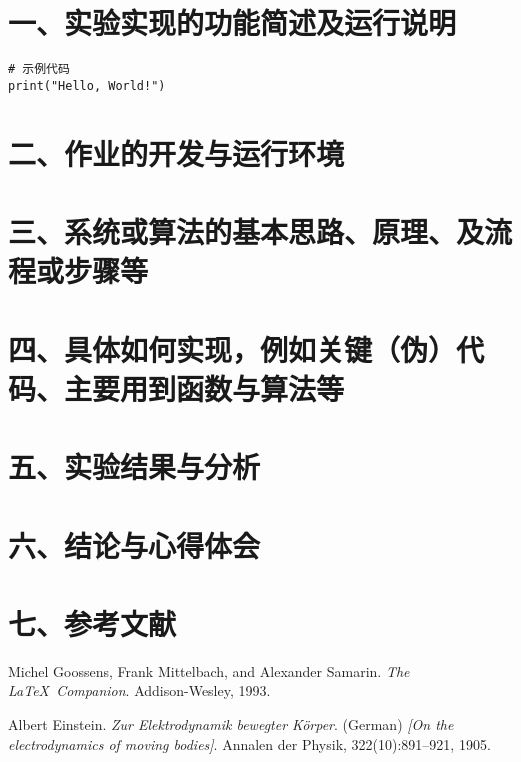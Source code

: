 \documentclass{CVrep}
\begin{document}
\maketitle

\section*{一、实验实现的功能简述及运行说明}
\begin{verbatim}
# 示例代码
print("Hello, World!")
\end{verbatim}


\section*{二、作业的开发与运行环境}

\section*{三、系统或算法的基本思路、原理、及流程或步骤等}

\section*{四、具体如何实现，例如关键（伪）代码、主要用到函数与算法等}

\section*{五、实验结果与分析}

\section*{六、结论与心得体会}

\section*{七、参考文献}
\begin{thebibliography}{9}
  Michel Goossens, Frank Mittelbach, and Alexander Samarin. 
  \textit{The \LaTeX\ Companion}. 
  Addison-Wesley, 1993.

  Albert Einstein. 
  \textit{Zur Elektrodynamik bewegter K{\"o}rper}. (German) \textit{[On the electrodynamics of moving bodies]}. 
  Annalen der Physik, 322(10):891–921, 1905.

\end{thebibliography}

\appendix
\end{document}
